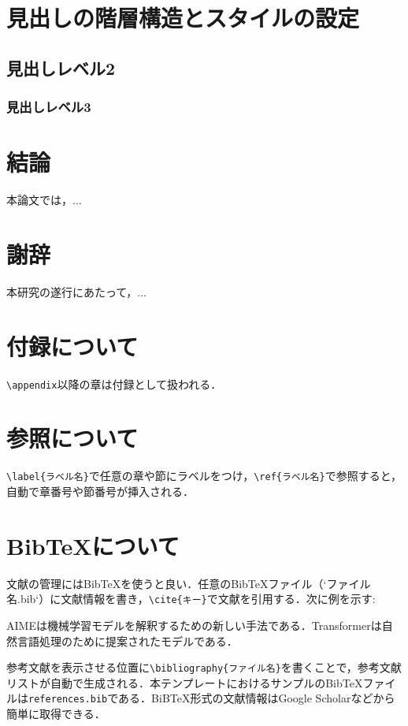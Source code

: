 \documentclass[titlepage,12pt]{ltjsarticle}
\begin{document}
\section{見出しの階層構造とスタイルの設定}\label{sec:hierarchy_style}
\subsection{見出しレベル2}\label{subsec:level2}
\subsubsection{見出しレベル3}\label{subsubsec:level3}


\section{結論}\label{sec:conclusion}
本論文では，...

\section*{謝辞}
本研究の遂行にあたって，...




\appendix
\section{付録について}\label{app:appendix}
\texttt{\textbackslash{}appendix}以降の章は付録として扱われる．

\section{参照について}\label{app:ref}
\texttt{\textbackslash{}label\{ラベル名\}}で任意の章や節にラベルをつけ，\texttt{\textbackslash{}ref\{ラベル名\}}で参照すると，自動で章番号や節番号が挿入される．

\section{BibTeXについて}\label{app:bibtex}
文献の管理にはBibTeXを使うと良い．任意のBibTeXファイル（`ファイル名.bib`）に文献情報を書き，\texttt{\textbackslash{}cite\{キー\}}で文献を引用する．次に例を示す:

AIME\cite{AIME}は機械学習モデルを解釈するための新しい手法である．Transformer\cite{transformer}は自然言語処理のために提案されたモデルである．

参考文献を表示させる位置に\texttt{\textbackslash{}bibliography\{ファイル名\}}を書くことで，参考文献リストが自動で生成される．本テンプレートにおけるサンプルのBibTeXファイルは\texttt{references.bib}である．BiBTeX形式の文献情報はGoogle Scholarなどから簡単に取得できる．
\end{document}
